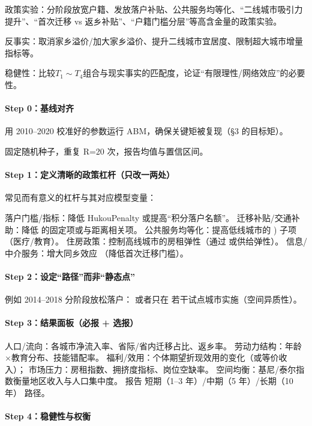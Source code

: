 \documentclass[
  a4paper,
  zihao=-4,
  fontset=mac,
  AutoFakeBold,
  AutoFakeSlant,
  oneside]{ctexbook}
\begin{document}
政策实验：分阶段放宽户籍、发放落户补贴、公共服务均等化、“二线城市吸引力提升”、“首次迁移 vs 返乡补贴”、“户籍门槛分层”等高含金量的政策实验。

反事实：取消家乡溢价/加大家乡溢价、提升二线城市宜居度、限制超大城市增量指标等。

稳健性：比较$T_1\sim T_4$组合与现实事实的匹配度，论证“有限理性/网络效应”的必要性。



\paragraph{Step 0：基线对齐}

用 2010–2020 校准好的参数运行 ABM，确保关键矩被复现（§3 的目标矩）。

固定随机种子，重复 
R=20 次，报告均值与置信区间。

\paragraph{Step 1：定义清晰的政策杠杆（只改一两处）}

常见而有意义的杠杆与其对应模型变量：

落户门槛/指标：降低 
HukouPenalty 或提高“积分落户名额”。
迁移补贴/交通补助：降低 
的固定项或与距离相关项。
公共服务均等化：提高低线城市的 ) 子项（医疗/教育）。
住房政策：控制高线城市的房租弹性（通过  或供给弹性）。
信息/中介服务：增大同乡效应 （降低首次迁移门槛）。

\paragraph{Step 2：设定“路径”而非“静态点”}

例如 2014–2018 分阶段放松落户：
或者只在 若干试点城市实施（空间异质性）。

\paragraph{Step 3：结果面板（必报 + 选报）}

人口/流向：各城市净流入率、省际/省内迁移占比、返乡率。
劳动力结构：年龄×教育分布、技能错配率。
福利/效用：个体期望折现效用的变化（或等价收入）；
市场压力：房租指数、拥挤度指标、岗位空缺率。
空间均衡：基尼/泰尔指数衡量地区收入与人口集中度。
报告 短期（1–3 年）/中期（5 年）/长期（10 年） 路径。

\paragraph{Step 4：稳健性与权衡}
\end{document}
